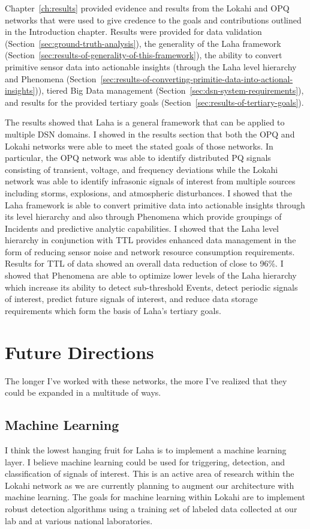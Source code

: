 Chapter~\ref{ch:results} provided evidence and results from the Lokahi and OPQ networks that were used to give credence to the goals and contributions outlined in the Introduction chapter. Results were provided for data validation (Section~\ref{sec:ground-truth-analysis}), the generality of the Laha framework (Section~\ref{sec:results-of-generality-of-this-framework}), the ability to convert primitive sensor data into actionable insights (through the Laha level hierarchy and Phenomena (Section~\ref{sec:results-of-converting-primitie-data-into-actional-insights})), tiered Big Data management (Section~\ref{sec:dsn-system-requirements}), and results for the provided tertiary goals (Section~\ref{sec:results-of-tertiary-goals}).

The results showed that Laha is a general framework that can be applied to multiple DSN domains. I showed in the results section that both the OPQ and Lokahi networks were able to meet the stated goals of those networks. In particular, the OPQ network was able to identify distributed PQ signals consisting of transient, voltage, and frequency deviations while the Lokahi network was able to identify infrasonic signals of interest from multiple sources including storms, explosions, and atmospheric disturbances. I showed that the Laha framework is able to convert primitive data into actionable insights through its level hierarchy and also through Phenomena which provide groupings of Incidents and predictive analytic capabilities. I showed that the Laha level hierarchy in conjunction with TTL provides enhanced data management in the form of reducing sensor noise and network resource consumption requirements. Results for TTL of data showed an overall data reduction of close to 96\%. I showed that Phenomena are able to optimize lower levels of the Laha hierarchy which increase its ability to detect sub-threshold Events, detect periodic signals of interest, predict future signals of interest, and reduce data storage requirements which form the basis of Laha's tertiary goals.

\section{Future Directions}\label{sec:future-directions}

The longer I've worked with these networks, the more I've realized that they could be expanded in a multitude of ways.

\subsection{Machine Learning}\label{subsec:machine-learning}
I think the lowest hanging fruit for Laha is to implement a machine learning layer. I believe machine learning could be used for triggering, detection, and classification of signals of interest. This is an active area of research within the Lokahi network as we are currently planning to augment our architecture with machine learning. The goals for machine learning within Lokahi are to implement robust detection algorithms using a training set of labeled data collected at our lab and at various national laboratories.

